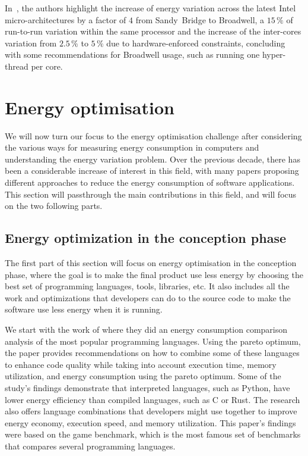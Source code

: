 In~\cite{marathe_empirical_2017_m}, the authors highlight the increase of energy variation across the latest Intel micro-architectures by a factor of $4$ from Sandy~Bridge to Broadwell, a $15\,\%$ of run-to-run variation within the same processor and the increase of the inter-cores variation from $2.5\,\%$ to $5\,\%$ due to hardware-enforced constraints, concluding with some recommendations for Broadwell usage, such as running one hyper-thread per core.

\section{Energy optimisation}

We will now turn our focus to the energy optimisation challenge after considering the various ways for measuring energy consumption in computers and understanding the energy variation problem.
Over the previous decade, there has been a considerable increase of interest in this field, with many papers proposing different approaches to reduce the energy consumption of software applications. This section will passthrough the main contributions in this field, and will focus on the two following parts.

\subsection{Energy optimization in the conception phase}
The first part of this section will focus on energy optimisation in the conception phase, where the goal is to make the final product use less energy by choosing the best set of programming languages, tools, libraries, etc. It also includes all the work and optimizations that developers can do to the source code to make the software use less energy when it is running.

We start with the work of \citeauthor{pereira_energy_2017} where they  did an energy consumption comparison analysis of the most popular programming languages.
Using the pareto optimum, the paper  provides recommendations on how to combine some of these languages to enhance code quality while taking into account execution time, memory utilization, and energy consumption using the pareto optimum. Some of the study's findings demonstrate that interpreted languages, such as Python, have lower energy efficiency than compiled languages, such as C or Rust. The research also offers language combinations that developers might use together to improve energy economy, execution speed, and memory utilization.
This paper's findings were based on the game benchmark, which is the most famous set of benchmarks that compares several programming languages.


